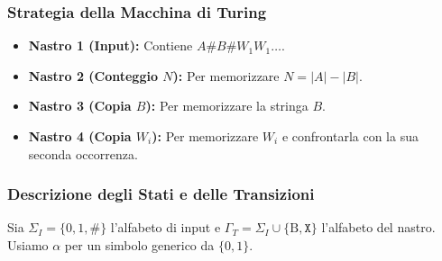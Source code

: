\documentclass[a4paper, 11pt]{book} %
\theoremstyle{definition}
\newcommand{\B}{\text{B}} %
\begin{document}
\subsubsection{Strategia della Macchina di Turing}
\begin{itemize}
    \item \textbf{Nastro 1 (Input):} Contiene $A\texttt{\#}B\texttt{\#}W_1 W_1 \dots$.
    \item \textbf{Nastro 2 (Conteggio $N$):} Per memorizzare $N = |A| - |B|$.
    \item \textbf{Nastro 3 (Copia $B$):} Per memorizzare la stringa $B$.
    \item \textbf{Nastro 4 (Copia $W_i$):} Per memorizzare $W_i$ e confrontarla con la sua seconda occorrenza.
\end{itemize}

\subsubsection{Descrizione degli Stati e delle Transizioni}
Sia $\Sigma_I = \{0,1,\texttt{\#}\}$ l'alfabeto di input e $\Gamma_T = \Sigma_I \cup \{\B, \texttt{X}\}$ l'alfabeto del nastro. Usiamo $\alpha$ per un simbolo generico da $\{0,1\}$.
\end{document}
